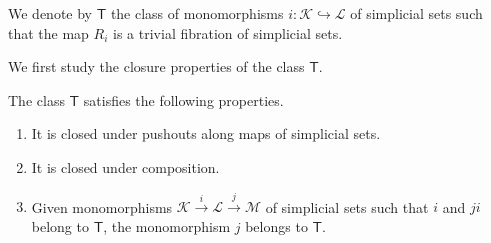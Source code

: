 \documentclass[10pt,reqno]{amsart}
\begin{document}
\begin{definition}
\label{def:class_T}
We denote by $\mathsf T$ the class of monomorphisms
$i:\mathcal K\hookrightarrow \mathcal L$ of simplicial sets such
that the map $R_i$ is a trivial fibration of simplicial sets.
\end{definition}

We first study the closure properties of the class $\mathsf T$.

\begin{lemma}
\label{lem:T_closure}
The class $\mathsf T$ satisfies the following properties.
\begin{enumerate}[label=(\arabic*)]
\item It is closed under pushouts along maps of simplicial sets.
\item It is closed under composition.
\item Given monomorphisms
$\mathcal K\xrightarrow{i}\mathcal L\xrightarrow{j}\mathcal M$ of
simplicial sets such that $i$ and $ji$ belong to $\mathsf T$,
the monomorphism $j$ belongs to $\mathsf T$.
\end{enumerate}
\end{lemma}
\end{document}
